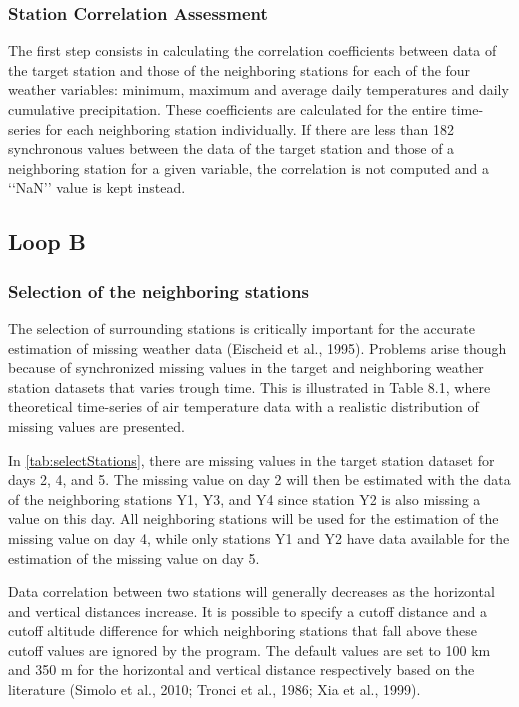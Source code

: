 \documentclass[ARTICLETHERMIC.tex]{subfiles}
\begin{document}
\subsubsection{Station Correlation Assessment}

The first step consists in calculating the correlation coefficients between data of the target station and those of the neighboring stations for each of the four weather variables: minimum, maximum and average daily temperatures and daily cumulative precipitation. These coefficients are calculated for the entire time-series for each neighboring station individually. If there are less than 182 synchronous values between the data of the target station and those of a neighboring station for a given variable, the correlation is not computed and a ‘‘NaN’’ value is kept instead.

\subsection{Loop B}

\subsubsection{Selection of the neighboring stations}

The selection of surrounding stations is critically important for the accurate estimation of missing weather data (Eischeid et al., 1995). Problems arise though because of synchronized missing values in the target and neighboring weather station datasets that varies trough time. This is illustrated in Table 8.1, where theoretical time-series of air temperature data with a realistic distribution of missing values are presented.

In \cref{tab:selectStations}, there are missing values in the target station dataset for days 2, 4, and 5. The missing value on day 2 will then be estimated with the data of the neighboring stations Y1, Y3, and Y4 since station Y2 is also missing a value on this day. All neighboring stations will be used for the estimation of the missing value on day 4, while only stations Y1 and Y2 have data available for the estimation of the missing value on day 5.

Data correlation between two stations will generally decreases as the horizontal and vertical distances increase. It is possible to specify a cutoff distance and a cutoff altitude difference for which neighboring stations that fall above these cutoff values are ignored by the program. The default values are set to 100 km and 350 m for the horizontal and vertical distance respectively based on the literature (Simolo et al., 2010; Tronci et al., 1986; Xia et al., 1999).
\end{document}
